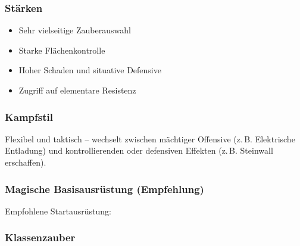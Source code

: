 \subsubsection*{Stärken}
\begin{itemize}
	\item Sehr vielseitige Zauberauswahl
	\item Starke Flächenkontrolle
	\item Hoher Schaden und situative Defensive
	\item Zugriff auf elementare Resistenz
\end{itemize}

\subsubsection*{Kampfstil}
Flexibel und taktisch – wechselt zwischen mächtiger Offensive
(z.\,B. Elektrische Entladung) und kontrollierenden oder defensiven Effekten
(z.\,B. Steinwall erschaffen).

\subsubsection*{Magische Basisausrüstung (Empfehlung)}
Empfohlene Startausrüstung:

\subsubsection*{Klassenzauber}


